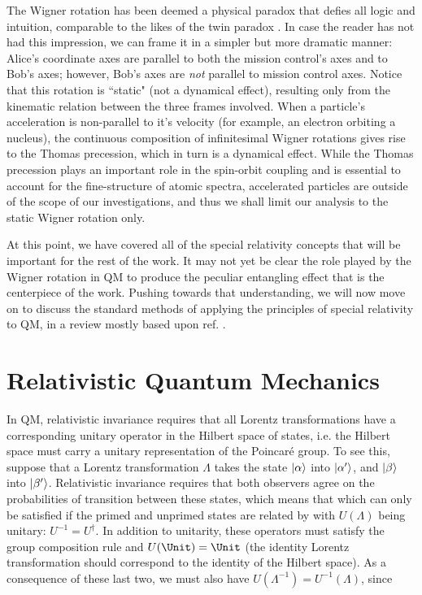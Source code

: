 \documentclass[12pt,a4paper,notitlepage]{report}
\begin{document}
The Wigner rotation has been deemed a physical paradox that defies all logic and intuition, comparable to the likes of the twin paradox \cite{goldstein_1980}. In case the reader has not had this impression, we can frame it in a simpler but more dramatic manner: Alice's coordinate axes are parallel to both the mission control's axes and to Bob's axes; however, Bob's axes are {\it not} parallel to mission control axes. Notice that this rotation is ``static" (not a dynamical effect), resulting only from the kinematic relation between the three frames involved. When a particle's acceleration is non-parallel to it's velocity (for example, an electron orbiting a nucleus), the continuous composition of infinitesimal Wigner rotations gives rise to the Thomas precession, which in turn is a dynamical effect. While the Thomas precession plays an important role in the spin-orbit coupling and is essential to account for the fine-structure of atomic spectra, accelerated particles are outside of the scope of our investigations, and thus we shall limit our analysis to the static Wigner rotation only.

At this point, we have covered all of the special relativity concepts that will be important for the rest of the work. It may not yet be clear the role played by the Wigner rotation in QM to produce the peculiar entangling effect that is the centerpiece of the work. Pushing towards that understanding, we will now move on to discuss the standard methods of applying the principles of special relativity to QM, in a review mostly based upon ref. \cite{weinberg}.


\section{Relativistic Quantum Mechanics}
\label{rqm}

In QM, relativistic invariance requires that all Lorentz transformations have a corresponding unitary operator in the Hilbert space of states, i.e. the Hilbert space must carry a unitary representation of the Poincaré group. To see this, suppose that a Lorentz transformation $\Lambda$ takes the state $\ket{\alpha}$ into $\ket{\alpha'}$, and $\ket{\beta}$ into $\ket{\beta'}$. Relativistic invariance requires that both observers agree on the probabilities of transition between these states, which means that
%
%
which can only be satisfied if the primed and unprimed states are related by
%
%
with $U(\Lambda)$ being unitary: $U^{-1} = U^\dagger$. In addition to unitarity, these operators must satisfy the group composition rule
%
%
and $U(\Unit) = \Unit$ (the identity Lorentz transformation should correspond to the identity of the Hilbert space). As a consequence of these last two, we must also have $U(\Lambda^{-1}) = U^{-1}(\Lambda)$, since
%
%
\end{document}
